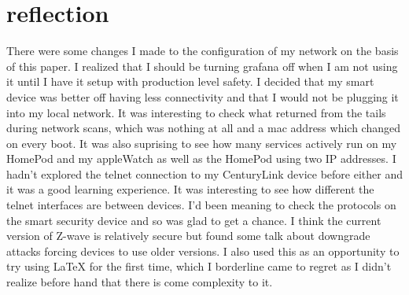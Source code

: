\documentclass[10pt]{article}
\begin{document}
\section*{reflection}
There were some changes I made to the configuration of my network on the basis of this paper. I realized that I should be turning 
grafana off when I am not using it until I have it setup with production level safety. I decided that my smart device was better off 
having less connectivity and that I would not be plugging it into my local network. It was interesting to check what returned from the 
tails during network scans, which was nothing at all and a mac address which changed on every boot. It was also suprising to see how
many services actively run on my HomePod and my appleWatch as well as the HomePod using two IP addresses. I hadn't explored the telnet
connection to my CenturyLink device before either and it was a good learning experience. It was interesting to see how different the telnet
interfaces are between devices. I'd been meaning to check the protocols on the smart security device and so was glad to get a chance. I 
think the current version of Z-wave is relatively secure but found some talk about downgrade attacks forcing devices to use older
versions. I also used this as an opportunity to try using LaTeX for the first time, which I borderline came to regret as I didn't realize
before hand that there is come complexity to it.
\end{document}
